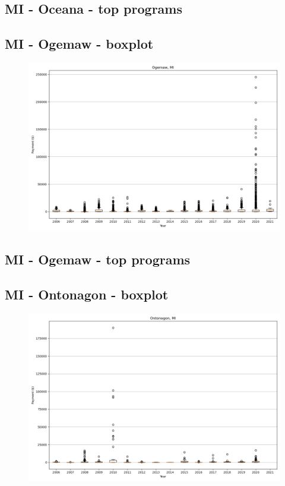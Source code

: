 \subsection*{MI - Oceana - top programs}

\newpage
\subsection*{MI - Ogemaw - boxplot}
\begin{figure}[h]
\centering
\includegraphics[width=7in]{../output/boxplots/counties/Ogemaw-MI_boxplot.png}
\end{figure}


\subsection*{MI - Ogemaw - top programs}

\newpage
\subsection*{MI - Ontonagon - boxplot}
\begin{figure}[h]
\centering
\includegraphics[width=7in]{../output/boxplots/counties/Ontonagon-MI_boxplot.png}
\end{figure}


